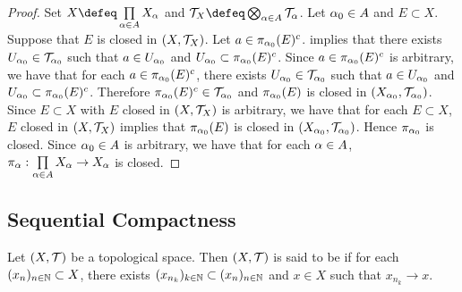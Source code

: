 \documentclass{book}
\begin{document}
 \begin{proof}
 	Set $X \defeq \prod\limits_{\al \in A} X_{\al}$ and $\MT_X \defeq \bigotimes_{\al \in A} \MT_{\al}$. Let $\alpha_0 \in A$ and $E \subset X$. Suppose that $E$ is closed in $(X, \mathcal{T}_X)$. Let $a \in \pi_{\alpha_0}(E)^c$.  implies that there exists $U_{\alpha_0} \in \mathcal{T}_{\alpha_0}$ such that $a \in U_{\alpha_0}$ and $U_{\alpha_0} \subset \pi_{\alpha_0}(E)^c$. Since $a \in \pi_{\alpha_0}(E)^c$ is arbitrary, we have that for each $a \in \pi_{\alpha_0}(E)^c$, there exists $U_{\alpha_0} \in \mathcal{T}_{\alpha_0}$ such that $a \in U_{\alpha_0}$ and $U_{\alpha_0} \subset \pi_{\alpha_0}(E)^c$. Therefore $\pi_{\alpha_0}(E)^c \in \mathcal{T}_{\alpha_0}$ and $\pi_{\alpha_0}(E)$ is closed in $(X_{\alpha_0}, \mathcal{T}_{\alpha_0})$. Since $E \subset X$ with $E$ closed in $(X, \mathcal{T}_X)$ is arbitrary, we have that for each $E \subset X$, $E$ closed in $(X, \mathcal{T}_X)$ implies that $\pi_{\alpha_0}(E)$ is closed in $(X_{\alpha_0}, \mathcal{T}_{\alpha_0})$. Hence $\pi_{\alpha_0}$ is closed. Since $\alpha_0 \in A$ is arbitrary, we have that for each $\alpha \in A$, $\pi_{\alpha} : \prod\limits_{\alpha \in A} X_{\alpha} \rightarrow X_{\alpha}$ is closed.
 \end{proof}
 
 
 
 
 
 
 
 
 
 
 
 
 
 
 
 
 
 
 
 
 
 
 
 
 
 
 
 
 
 
 
 
 
 
 
 
 
 
 
 
 
 \subsection{Sequential Compactness}
 
 \begin{defn}  
 	Let $(X, \mathcal{T})$ be a topological space. Then $(X, \mathcal{T})$ is said to be  if for each $(x_n)_{n \in \mathbb{N}} \subset X$, there exists $(x_{n_k})_{k \in \mathbb{N}} \subset (x_n)_{n \in \mathbb{N}}$ and $x \in X$ such that $x_{n_k} \rightarrow x$.   
 \end{defn}
\end{document}
